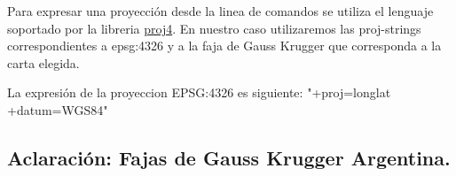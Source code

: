 \documentclass[12pt,]{extarticle}
\begin{document}
Para expresar una proyección desde la linea de comandos se utiliza el
lenguaje soportado por la libreria
\href{https://proj4.org/usage/quickstart.html}{proj4}. En nuestro caso
utilizaremos las proj-strings correspondientes a epsg:4326 y a la faja
de Gauss Krugger que corresponda a la carta elegida.

La expresión de la proyeccion EPSG:4326 es siguiente: "+proj=longlat
+datum=WGS84"

\hypertarget{aclaraciuxf3n-fajas-de-gauss-krugger-argentina.}{%
\subsection{Aclaración: Fajas de Gauss Krugger
Argentina.}\label{aclaraciuxf3n-fajas-de-gauss-krugger-argentina.}}

\begin{figure}
\centering

\end{figure}
\end{document}
